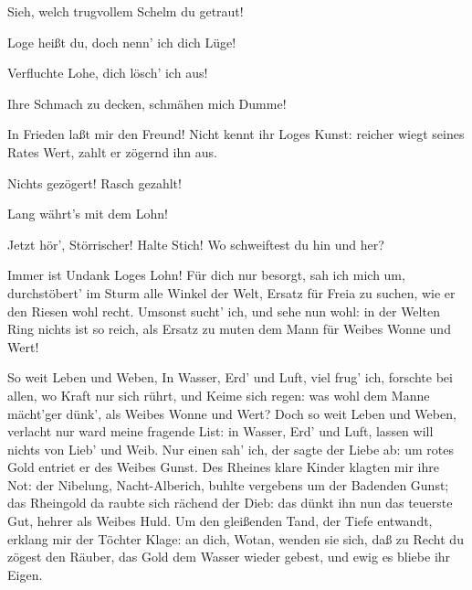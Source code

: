 \begin{drama}
\Frickaspeaks


Sieh, welch trugvollem Schelm du getraut!
 

\Frohspeaks
Loge heißt du,
doch nenn' ich dich Lüge!
 

\Donnerspeaks
Verfluchte Lohe, dich lösch' ich aus!
 

\Logespeaks
Ihre Schmach zu decken,
schmähen mich Dumme!
 




\Wotanspeaks


In Frieden laßt mir den Freund!
Nicht kennt ihr Loges Kunst:
reicher wiegt seines Rates Wert,
zahlt er zögernd ihn aus.
 

\Fafnerspeaks
Nichts gezögert! Rasch gezahlt!
 

\Fasoltspeaks
Lang währt's mit dem Lohn!
 

\Wotanspeaks


Jetzt hör', Störrischer! Halte Stich!
Wo schweiftest du hin und her?
 

\Logespeaks
Immer ist Undank Loges Lohn!
Für dich nur besorgt, sah ich mich um,
durchstöbert' im Sturm alle Winkel der Welt,
Ersatz für Freia zu suchen,
wie er den Riesen wohl recht.
Umsonst sucht' ich, und sehe nun wohl:
in der Welten Ring nichts ist so reich,
als Ersatz zu muten dem Mann
für Weibes Wonne und Wert!
 



So weit Leben und Weben,
In Wasser, Erd' und Luft,
viel frug' ich, forschte bei allen,
wo Kraft nur sich rührt, und Keime sich regen:
was wohl dem Manne mächt'ger dünk',
als Weibes Wonne und Wert?
Doch so weit Leben und Weben,
verlacht nur ward meine fragende List:
in Wasser, Erd' und Luft,
lassen will nichts von Lieb' und Weib.
Nur einen sah' ich, der sagte der Liebe ab:
um rotes Gold entriet er des Weibes Gunst.
Des Rheines klare Kinder
klagten mir ihre Not:
der Nibelung, Nacht-Alberich,
buhlte vergebens um der Badenden Gunst;
das Rheingold da
raubte sich rächend der Dieb:
das dünkt ihn nun das teuerste Gut,
hehrer als Weibes Huld.
Um den gleißenden Tand,
der Tiefe entwandt,
erklang mir der Töchter Klage:
an dich, Wotan, wenden sie sich,
daß zu Recht du zögest den Räuber,
das Gold dem Wasser wieder gebest,
und ewig es bliebe ihr Eigen.
 



\end{drama}
